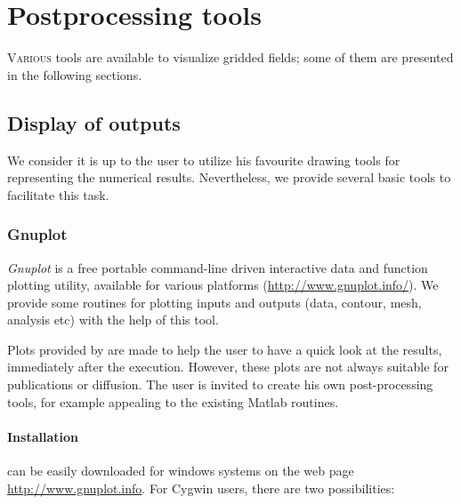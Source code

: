 \chapter{Postprocessing tools\label{chap:postprocessing}}
\lettrine[lines=2, loversize=-0.1, lraise=0.1]{V}{arious} tools are available to visualize gridded fields; some of them are presented in the following sections.

\minitoc


\section{Display of outputs\label{visutools}}

We consider it is up to the user to utilize his favourite drawing tools for representing the numerical results. Nevertheless, we provide several basic tools to facilitate this task.

\subsection{Gnuplot\label{sec:visugnuplot}}

\textsl{Gnuplot} is a free portable command-line driven interactive data and function plotting utility, available for various platforms (\url{http://www.gnuplot.info/}). We provide some routines for plotting \diva inputs and outputs (data, contour, mesh, analysis etc) with the help of this tool.

\begin{tips}
Plots provided by \gnuplot are made to help the user to have a quick look at the results, immediately after the execution. However, these plots are not always suitable for publications or diffusion. The user is invited to create his own post-processing tools, for example appealing to the existing Matlab routines.
\end{tips}


\subsubsection{Installation}

\gnuplot can be easily downloaded for windows systems on the web page \url{http://www.gnuplot.info}. For Cygwin users, there are two possibilities:

